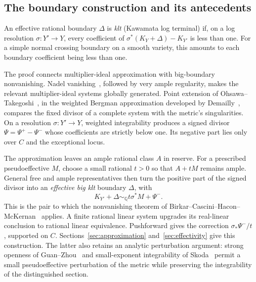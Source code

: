 \subsection{The boundary construction and its antecedents}

An effective rational boundary $\Delta$ is \emph{klt}
(Kawamata log terminal) if, on a log resolution $\sigma:Y'\to Y$,
every coefficient of
$\sigma^*(K_Y+\Delta)-K_{Y'}$ is less than one.
For a simple normal crossing boundary on a smooth variety, this
amounts to each boundary coefficient being less than one.

The proof connects multiplier-ideal approximation with big-boundary
nonvanishing.  Nadel vanishing~\cite{Nadel1990}, followed by very ample
regularity, makes the relevant multiplier-ideal systems globally
generated.  Point extension of Ohsawa--Takegoshi~\cite{OhsawaTakegoshi1987},
in the weighted Bergman approximation developed by
Demailly~\cite{Demailly2015}, compares the fixed divisor of a complete
system with the metric's singularities.  On a resolution
$\sigma:Y'\to Y$, weighted integrability produces a signed divisor
$\Psi=\Psi^+-\Psi^-$ whose coefficients are strictly below one.
Its negative part lies only over $C$ and the exceptional locus.

The approximation leaves an ample rational class $A$ in reserve.
For a prescribed pseudoeffective $M$, choose a small rational $t>0$
so that $A+tM$ remains ample.  General free and ample representatives
then turn the positive part of the signed divisor into an
\emph{effective big klt} boundary $\Delta$, with
\[
 K_{Y'}+\Delta\sim_{\mathbb Q}t\sigma^*M+\Psi^-.
\]
This is the pair to which the nonvanishing theorem of
Birkar--Cascini--Hacon--McKernan~\cite[Theorem D]{BCHM2010} applies.
A finite rational linear system upgrades its real-linear conclusion
to rational linear equivalence.  Pushforward gives the correction
$\sigma_*\Psi^-/t$, supported on $C$.
Sections~\ref{sec:approximation} and~\ref{sec:effectivity} give this
construction.  The latter also retains an analytic perturbation
argument: strong openness of Guan--Zhou~\cite{GuanZhou2015} and
small-exponent integrability of Skoda~\cite{Skoda1972} permit a small
pseudoeffective perturbation of the metric while preserving the
integrability of the distinguished section.

